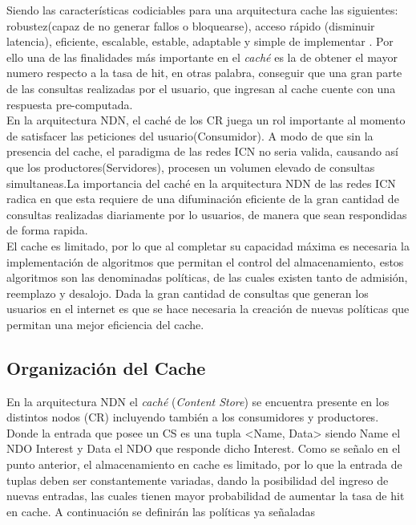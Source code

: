 \documentclass[12pt]{ociamthesis}  %
\begin{document}
Siendo las características codiciables para una arquitectura cache las siguientes: robustez(capaz de no generar fallos o bloquearse), acceso rápido (disminuir latencia), eficiente, escalable, estable, adaptable y simple de implementar \cite{wang1999survey}. Por ello una de las finalidades más importante en el \textit{caché} es la de obtener el mayor numero respecto a la tasa de hit, en otras palabra, conseguir que una gran parte de las consultas realizadas por el usuario, que ingresan al cache cuente con una respuesta pre-computada.\\

En la arquitectura NDN, el caché de los CR juega un rol importante al momento de satisfacer las peticiones del usuario(Consumidor). A modo de que sin la presencia del cache, el paradigma de las redes ICN no seria valida, causando así que los productores(Servidores), procesen un volumen elevado de consultas simultaneas.La importancia del caché en la arquitectura NDN de las redes ICN radica en que esta requiere de una difuminación eficiente de la gran cantidad de consultas realizadas diariamente por lo usuarios, de manera que sean respondidas de forma rapida.\\

El cache es limitado, por lo que al completar su capacidad máxima es necesaria la  implementación de algoritmos que permitan el control del almacenamiento, estos algoritmos son las denominadas políticas, de las cuales existen tanto de admisión, reemplazo y desalojo. Dada la gran cantidad de consultas que generan los usuarios en el internet es que se hace necesaria la creación de nuevas políticas que permitan una mejor eficiencia del cache.\\

\subsection{Organización del Cache}

En la arquitectura NDN el \textit{caché} (\textit{Content Store}) se encuentra presente en los distintos nodos (CR) incluyendo también a los consumidores y productores. Donde la entrada que posee un CS es una tupla <Name, Data> siendo Name el NDO Interest y Data el NDO que responde dicho Interest. Como se señalo en el punto anterior, el almacenamiento en cache es limitado, por lo que la entrada de tuplas deben ser constantemente variadas, dando la posibilidad del ingreso de nuevas entradas, las cuales tienen mayor probabilidad de aumentar la tasa de hit en cache. A continuación se definirán las políticas ya señaladas 
\end{document}
